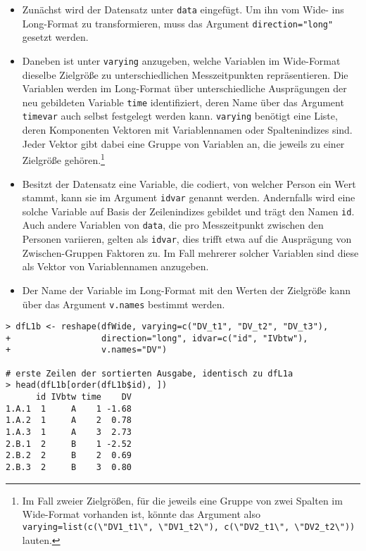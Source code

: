 \begin{itemize}
\item Zunächst wird der Datensatz unter \lstinline!data! eingefügt. Um ihn vom Wide- ins Long-Format zu transformieren, muss das Argument \lstinline!direction="long"! gesetzt werden.
\item Daneben ist unter \lstinline!varying! anzugeben, welche Variablen im Wide-Format dieselbe Zielgröße zu unterschiedlichen Messzeitpunkten repräsentieren. Die Variablen werden im Long-Format über unterschiedliche Ausprägungen der neu gebildeten Variable \lstinline!time! identifiziert, deren Name über das Argument \lstinline!timevar! auch selbst festgelegt werden kann. \lstinline!varying! benötigt eine Liste, deren Komponenten Vektoren mit Variablennamen oder Spaltenindizes sind. Jeder Vektor gibt dabei eine Gruppe von Variablen an, die jeweils zu einer Zielgröße gehören.\footnote{Im Fall zweier Zielgrößen, für die jeweils eine Gruppe von zwei Spalten im Wide-Format vorhanden ist, könnte das Argument also \lstinline!varying=list(c(\"DV1_t1\", \"DV1_t2\"), c(\"DV2_t1\", \"DV2_t2\"))! lauten.}
\item Besitzt der Datensatz eine Variable, die codiert, von welcher Person ein Wert stammt, kann sie im Argument \lstinline!idvar! genannt werden. Andernfalls wird eine solche Variable auf Basis der Zeilenindizes gebildet und trägt den Namen \lstinline!id!. Auch andere Variablen von \lstinline!data!, die pro Messzeitpunkt zwischen den Personen variieren, gelten als \lstinline!idvar!, dies trifft etwa auf die Ausprägung von Zwischen-Gruppen Faktoren zu. Im Fall mehrerer solcher Variablen sind diese als Vektor von Variablennamen anzugeben.
\item Der Name der Variable im Long-Format mit den Werten der Zielgröße kann über das Argument \lstinline!v.names! bestimmt werden.
\end{itemize}

\begin{lstlisting}
> dfL1b <- reshape(dfWide, varying=c("DV_t1", "DV_t2", "DV_t3"),
+                  direction="long", idvar=c("id", "IVbtw"),
+                  v.names="DV")

# erste Zeilen der sortierten Ausgabe, identisch zu dfL1a
> head(dfL1b[order(dfL1b$id), ])
      id IVbtw time    DV
1.A.1  1     A    1 -1.68
1.A.2  1     A    2  0.78
1.A.3  1     A    3  2.73
2.B.1  2     B    1 -2.52
2.B.2  2     B    2  0.69
2.B.3  2     B    3  0.80
\end{lstlisting}

